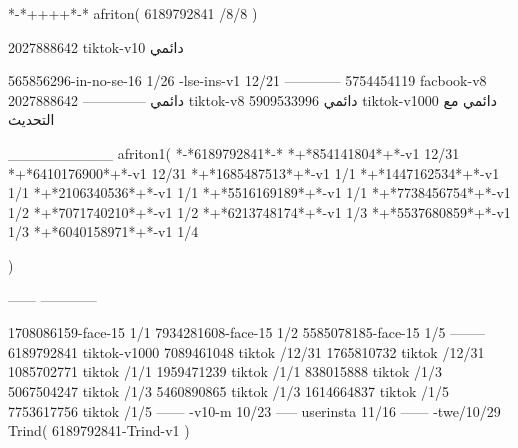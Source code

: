 *-*++++*-*
afriton(
6189792841 /8/8
)

2027888642 tiktok-v10
دائمي

565856296-in-no-se-16 1/26
-lse-ins-v1 12/21
------------
5754454119 facbook-v8
دائمي
--------------
2027888642 tiktok-v8
دائمي
5909533996 tiktok-v1000
دائمي مع التحديث

__________
afriton1(
*-*6189792841*-*
*+*854141804*+*-v1 12/31
*+*6410176900*+*-v1 12/31
*+*1685487513*+*-v1 1/1
*+*1447162534*+*-v1 1/1
*+*2106340536*+*-v1 1/1
*+*5516169189*+*-v1 1/1
*+*7738456754*+*-v1 1/2
*+*7071740210*+*-v1 1/2
*+*6213748174*+*-v1 1/3
*+*5537680859*+*-v1 1/3
*+*6040158971*+*-v1 1/4

)

------
------------

1708086159-face-15 1/1
7934281608-face-15 1/2
5585078185-face-15 1/5
--------
6189792841 tiktok-v1000
7089461048 tiktok /12/31
1765810732 tiktok /12/31
1085702771 tiktok /1/1
1959471239 tiktok /1/1
838015888 tiktok /1/3
5067504247 tiktok /1/3
5460890865 tiktok /1/3
1614664837 tiktok /1/5
7753617756 tiktok /1/5
------
-v10-m 10/23
-----
userinsta 11/16
------
-twe/10/29
Trind(
6189792841-Trind-v1 
)
